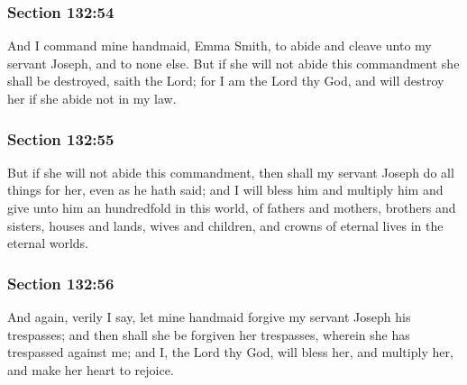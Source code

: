 	\subsubsection{Section 132:54} %
		\label{DC132-54}

		And I command mine handmaid, Emma Smith, to abide and cleave unto my servant Joseph, and to none else. But if she will not abide this commandment she shall be destroyed, saith the Lord; for I am the Lord thy God, and will destroy her if she abide not in my law.


	\subsubsection{Section 132:55} %
		\label{DC132-55}

		But if she will not abide this commandment, then shall my servant Joseph do all things for her, even as he hath said; and I will bless him and multiply him and give unto him an hundredfold in this world, of fathers and mothers, brothers and sisters, houses and lands, wives and children, and crowns of eternal lives in the eternal worlds.


	\subsubsection{Section 132:56} %
		\label{DC132-56}

		And again, verily I say, let mine handmaid forgive my servant Joseph his trespasses; and then shall she be forgiven her trespasses, wherein she has trespassed against me; and I, the Lord thy God, will bless her, and multiply her, and make her heart to rejoice.

